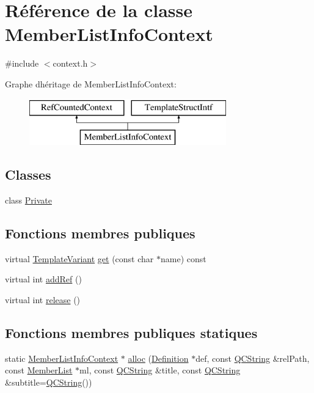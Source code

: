 \hypertarget{class_member_list_info_context}{}\section{Référence de la classe Member\+List\+Info\+Context}
\label{class_member_list_info_context}


{\ttfamily \#include $<$context.\+h$>$}

Graphe d\textquotesingle{}héritage de Member\+List\+Info\+Context\+:\begin{figure}[H]
\begin{center}
\leavevmode
\includegraphics[height=2.000000cm]{class_member_list_info_context}
\end{center}
\end{figure}
\subsection*{Classes}
\begin{DoxyCompactItemize}
\item 
class \hyperlink{class_member_list_info_context_1_1_private}{Private}
\end{DoxyCompactItemize}
\subsection*{Fonctions membres publiques}
\begin{DoxyCompactItemize}
\item 
virtual \hyperlink{class_template_variant}{Template\+Variant} \hyperlink{class_member_list_info_context_a4a7712b25633ac1361c727f777aef8a2}{get} (const char $\ast$name) const 
\item 
virtual int \hyperlink{class_member_list_info_context_a8c6f32abaf9278db133168c67a821215}{add\+Ref} ()
\item 
virtual int \hyperlink{class_member_list_info_context_a86721904ec41349332da05e5cb3325d9}{release} ()
\end{DoxyCompactItemize}
\subsection*{Fonctions membres publiques statiques}
\begin{DoxyCompactItemize}
\item 
static \hyperlink{class_member_list_info_context}{Member\+List\+Info\+Context} $\ast$ \hyperlink{class_member_list_info_context_a51c25e2e65e4241a5333e28ad447abe3}{alloc} (\hyperlink{class_definition}{Definition} $\ast$def, const \hyperlink{class_q_c_string}{Q\+C\+String} \&rel\+Path, const \hyperlink{class_member_list}{Member\+List} $\ast$ml, const \hyperlink{class_q_c_string}{Q\+C\+String} \&title, const \hyperlink{class_q_c_string}{Q\+C\+String} \&subtitle=\hyperlink{class_q_c_string}{Q\+C\+String}())
\end{DoxyCompactItemize}


